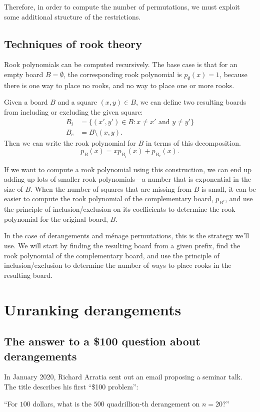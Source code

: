 Therefore, in order to compute the number of permutations, we must exploit some
additional structure of the restrictions.

\subsection{Techniques of rook theory}
Rook polynomials can be computed recursively. The base case is that
for an empty board $B = \emptyset$, the corresponding rook polynomial is
$p_\emptyset(x) = 1$, because there is one way to place no rooks, and no way
to place one or more rooks.
\begin{lemma}
  Given a board $B$ and a square $(x,y) \in B$, we can define
  two resulting boards from including or excluding the given square:
  \begin{align}
    B_i &= \{(x',y') \in B : x \neq x' \text{ and } y \neq y'\} \\
    B_e &= B \setminus {(x,y)}.
  \end{align}
  Then we can write the rook polynomial for $B$ in terms of this decomposition.
  \begin{equation}
    p_B(x) = xp_{B_i}(x) + p_{B_e}(x).
  \end{equation}
  \label{lemma:rookPolynomialRecursion}
\end{lemma}

If we want to compute a rook polynomial using this construction, we can end
up adding up lots of smaller rook polynomials---a number that is exponential in
the size of $B$.
When the number of squares that are missing from $B$ is small,
it can be easier to compute the rook polynomial of the complementary board,
$p_{B^c}$, and use the principle of
inclusion/exclusion on its coefficients to determine the rook polynomial for
the original board, $B$.

In the case of derangements and m\'enage permutations, this is the strategy
we'll use.
We will start by finding the resulting board from a given prefix,
find the rook polynomial of the complementary board, and
use the principle of inclusion/exclusion to determine the number of ways to
place rooks in the resulting board.

\section{Unranking derangements}

\subsection{The answer to a \$100 question about derangements}
In January 2020, Richard Arratia sent out an email proposing a seminar talk.
The title describes his first ``\$100 problem'':
\begin{problem}
``For $100$ dollars, what is the $500$ quadrillion-th derangement on $n=20$?''
\end{problem}


